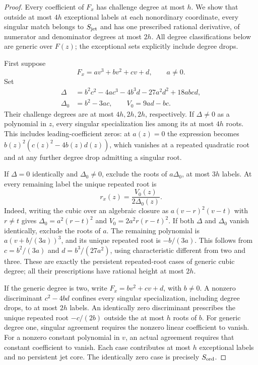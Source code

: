\begin{proof}
Every coefficient of $F_x$ has challenge degree at most $h$.  We show
that outside at most $4h$ exceptional labels at each nonordinary
coordinate, every singular match belongs to $S_{\rm jet}$ and has
one prescribed rational derivative, of numerator and denominator
degrees at most $2h$.  All degree classifications below are generic
over $F(z)$; the exceptional sets explicitly include degree drops.

First suppose
\[
 F_x=a v^3+b v^2+c v+d,\qquad a\ne0.
\]
Set
\begin{align*}
 \Delta&=b^2c^2-4ac^3-4b^3d-27a^2d^2+18abcd,\\
 \Delta_0&=b^2-3ac,\qquad V_0=9ad-bc.
\end{align*}
Their challenge degrees are at most $4h,2h,2h$, respectively.
If $\Delta\ne0$ as a polynomial in $z$, every singular specialization
lies among its at most $4h$ roots.  This includes leading-coefficient
zeros: at $a(z)=0$ the expression becomes
$b(z)^2(c(z)^2-4b(z)d(z))$, which vanishes at a repeated quadratic
root and at any further degree drop admitting a singular root.

If $\Delta=0$ identically and $\Delta_0\ne0$, exclude the roots of
$a\Delta_0$, at most $3h$ labels.  At every remaining label the unique
repeated root is
\begin{equation}
 r_x(z)=\frac{V_0(z)}{2\Delta_0(z)}.
 \label{eq:hj-cubic-repeated-root}
\end{equation}
Indeed, writing the cubic over an algebraic closure as
$a(v-r)^2(v-t)$ with $r\ne t$ gives
$\Delta_0=a^2(r-t)^2$ and $V_0=2a^2r(r-t)^2$.
If both $\Delta$ and $\Delta_0$ vanish identically, exclude the roots
of $a$.  The remaining polynomial is
$a(v+b/(3a))^3$, and its unique repeated root is $-b/(3a)$.
This follows from $c=b^2/(3a)$ and $d=b^3/(27a^2)$, using
characteristic different from two and three.  These are exactly the
persistent repeated-root cases of generic cubic degree; all their
prescriptions have rational height at most $2h$.

If the generic degree is two, write $F_x=bv^2+cv+d$, with $b\ne0$.
A nonzero discriminant $c^2-4bd$ confines every singular specialization,
including degree drops, to at most $2h$ labels.  An identically zero
discriminant prescribes the unique repeated root $-c/(2b)$ outside
the at most $h$ roots of $b$.
For generic degree one, singular agreement requires the nonzero linear
coefficient to vanish.  For a nonzero constant polynomial in $v$, an
actual agreement requires that constant coefficient to vanish.  Each
case contributes at most $h$ exceptional labels and no persistent
jet core.  The identically zero case is precisely $S_{\rm ord}$.


\end{proof}
